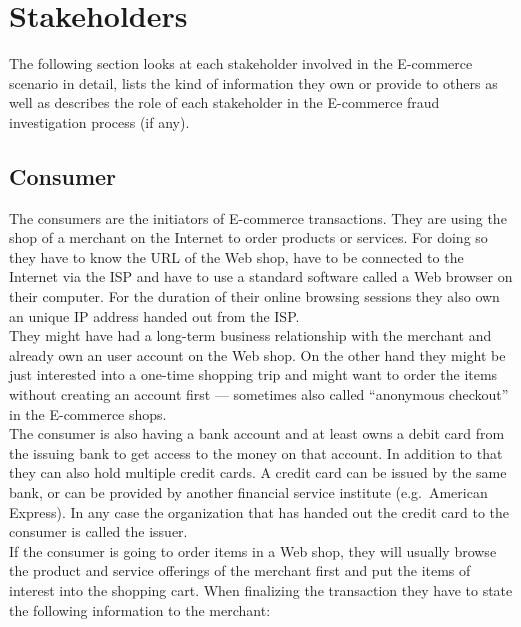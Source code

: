 
\section{Stakeholders}
\label{sec:stakeholder_analysis}

The following section looks at each stakeholder involved in the \gls{E-commerce} scenario in detail, lists the kind of information they own or provide to others as well as describes the role of each stakeholder in the \gls{E-commerce} fraud investigation process (if any).

\subsection{Consumer}
\label{subsec:stakeholder_consumer}

The consumers are the initiators of \gls{E-commerce} transactions. They are using the shop of a merchant on the Internet to order products or services. For doing so they have to know the \gls{URL} of the Web shop, have to be connected to the Internet via the \gls{ISP} and have to use a standard software called a Web browser on their computer. For the duration of their online browsing sessions they also own an unique \gls{IP} address handed out from the \gls{ISP}.\\

They might have had a long-term business relationship with the merchant and already own an user account on the Web shop. On the other hand they might be just interested into a one-time shopping trip and might want to order the items without creating an account first --- sometimes also called ``anonymous checkout'' in the \gls{E-commerce} shops. \\

The consumer is also having a bank account and at least owns a debit card from the issuing bank to get access to the money on that account. In addition to that they can also hold multiple credit cards. A credit card can be issued by the same bank, or can be provided by another financial service institute (e.g.\ American Express). In any case the organization that has handed out the credit card to the consumer is called the issuer. \\

If the consumer is going to order items in a Web shop, they will usually browse the product and service offerings of the merchant first and put the items of interest into the shopping cart. When finalizing the transaction they have to state the following information to the merchant:\@

